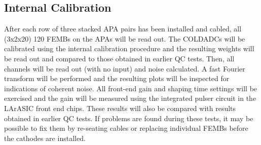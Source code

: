 \subsection{Internal Calibration}
\label{sec:fdsp-tpcelec-integration-calib}

After each row of three stacked APA pairs has been installed and cabled, all (3x2x20) 120 FEMBs on the APAs will be read out.  The COLDADCs will be calibrated using the internal calibration procedure and the resulting weights will be read out and compared to those obtained in earlier QC tests.  Then, all channels will be read out (with no input) and noise calculated.  A fast Fourier transform will be performed and the resulting plots will be inspected for indications of coherent noise.  All front-end gain and shaping time settings will be exercised and the gain will be measured using the integrated pulser circuit in the LArASIC front end chips.  These results will also be compared with results obtained in earlier QC tests.  If problems are found during these tests, it may be possible to fix them by re-seating cables or replacing individual FEMBs before the cathodes are installed.
